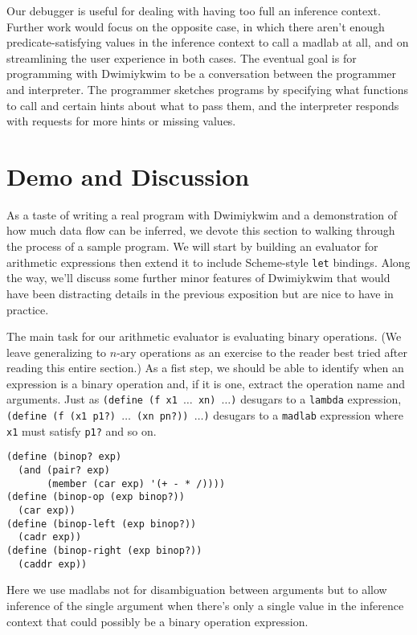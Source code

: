 \documentclass[11pt]{article}
\begin{document}
Our debugger is useful for dealing with having too full an inference context.
Further work would focus on the opposite case, in which
there aren't enough predicate-satisfying values in the inference context
to call a madlab at all,
and on streamlining the user experience in both cases.
The eventual goal is for programming with Dwimiykwim to be
a conversation between the programmer and interpreter.
The programmer sketches programs by specifying what functions to call
and certain hints about what to pass them,
and the interpreter responds with requests for more hints or missing values.


\section{Demo and Discussion}

As a taste of writing a real program with Dwimiykwim
and a demonstration of how much data flow can be inferred,
we devote this section to walking through the process of a sample program.
We will start by building an evaluator for arithmetic expressions
then extend it to include Scheme-style \texttt{let} bindings.
Along the way, we'll discuss some further minor features of Dwimiykwim
that would have been distracting details in the previous exposition
but are nice to have in practice.

The main task for our arithmetic evaluator is evaluating binary operations.
(We leave generalizing to $n$-ary operations as an exercise to the reader
best tried after reading this entire section.)
As a fist step, we should be able to identify
when an expression is a binary operation
and, if it is one, extract the operation name and arguments.
Just as \texttt{(define (f x1 $\dots$ xn) $\dots$)}
desugars to a \texttt{lambda} expression,
\texttt{(define (f (x1 p1?) $\dots$ (xn pn?)) $\dots$)}
desugars to a \texttt{madlab} expression
where \texttt{x1} must satisfy \texttt{p1?} and so on.
\begin{Verbatim}
(define (binop? exp)
  (and (pair? exp)
       (member (car exp) '(+ - * /))))
(define (binop-op (exp binop?))
  (car exp))
(define (binop-left (exp binop?))
  (cadr exp))
(define (binop-right (exp binop?))
  (caddr exp))
\end{Verbatim}
Here we use madlabs not for disambiguation between arguments
but to allow inference of the single argument
when there's only a single value in the inference context
that could possibly be a binary operation expression.
\end{document}
